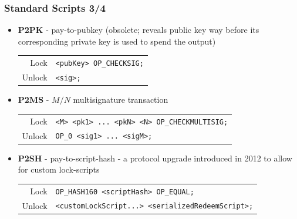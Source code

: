 \documentclass{beamer}
\begin{document}
\begin{frame}[fragile]
  \frametitle{Standard Scripts 3/4}
  \begin{itemize}
  \item \textbf{P2PK} - pay-to-pubkey (obsolete; reveals public key way before
    its corresponding private key is used to spend the output)
    \break
    \begin{tabular}{rl}
      Lock &\tiny\texttt{<pubKey> OP_CHECKSIG;} \\
      Unlock &\tiny\texttt{<sig>;} \\
    \end{tabular}
  \item \textbf{P2MS} - $M/N$ multisignature transaction
    \break
    \begin{tabular}{rl}
      Lock &\tiny\texttt{<M> <pk1> ... <pkN> <N> OP_CHECKMULTISIG;} \\
      Unlock &\tiny\texttt{OP_0 <sig1> ... <sigM>;} \\
    \end{tabular}
  \item \textbf{P2SH} - pay-to-script-hash - a protocol upgrade introduced in
    2012 to allow for custom lock-scripts
    \break
    \begin{tabular}{rl}
      Lock &\tiny\texttt{OP_HASH160 <scriptHash> OP_EQUAL;} \\
      Unlock &\tiny\texttt{<customLockScript...> <serializedRedeemScript>;} \\
    \end{tabular}
  \end{itemize}
\end{frame}
\end{document}
